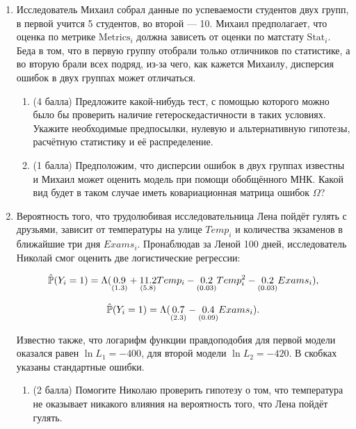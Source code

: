 \begin{enumerate}
\item %

Исследователь Михаил собрал данные по успеваемости студентов двух групп, в первой учится 5 студентов, во второй — 10. Михаил предполагает, что оценка по метрике $\text{Metrics}_i$ должна зависеть от оценки по матстату $\text{Stat}_i$. Беда в том, что в первую группу отобрали только отличников по статистике, а во вторую брали всех подряд, из-за чего, как кажется Михаилу, дисперсия ошибок в двух группах может отличаться. 

\begin{enumerate}
    \item (4 балла) Предложите какой-нибудь тест, с помощью которого можно было бы проверить наличие гетероскедастичности в таких условиях. Укажите необходимые предпосылки, нулевую и альтернативную гипотезы, расчётную статистику и её распределение. 
    
    \item (1 балла) Предположим, что дисперсии ошибок в двух группах известны и Михаил может оценить модель при помощи обобщённого МНК. Какой вид будет в таком случае иметь ковариационная матрица ошибок $\Omega$?
    
\end{enumerate}


\item %

Вероятность того, что трудолюбивая исследовательница Лена пойдёт гулять с друзьями, зависит от температуры на улице $Temp_i$ и количества экзаменов в ближайшие три дня $Exams_i$. Пронаблюдав за Леной 100 дней, исследователь Николай смог оценить две логистические регрессии:

\[
\hat \P(Y_i = 1) = \Lambda( \underset{(1.3)}{0.9} + \underset{(5.8)}{11.2} Temp_i - \underset{(0.03)}{0.2} Temp_i^2 - \underset{(0.03)}{0.2} Exams_i ),
\]

\[
\hat \P(Y_i = 1) = \Lambda( \underset{(2.3)}{0.7} - \underset{(0.09)}{0.4} Exams_i ).
\]

Известно также, что логарифм функции правдоподобия для первой модели оказался равен $\ln L_1 = -400$, для второй модели $\ln L_2 = -420$. 
В скобках указаны стандартные ошибки.

\begin{enumerate}
    \item (2 балла) Помогите Николаю проверить гипотезу о том, что температура не оказывает никакого влияния на вероятность того, что Лена пойдёт гулять.
    

\end{enumerate}
\end{enumerate}
